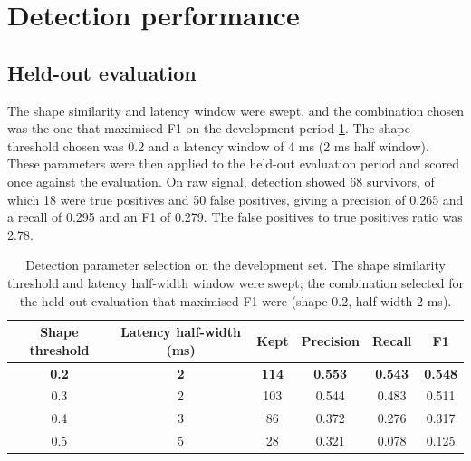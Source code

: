 \documentclass[ %
                    author={Daniel Page},
                supervisor={Dr. Andrew Calway},
                    degree={MSc},
                     title={Some Structural Guidelines for Data Science MSc Theses, Including Those With Long Titles that Run Across Multiple Lines on the Front Page},
                  subtitle={And those including an optional subtitle too, for good measure},
                      type={},
                      year={2021}]{dissertation}
\begin{document}
\section{Detection performance}
\subsection{Held-out evaluation}
The shape similarity and latency window were swept, and the combination chosen was the one that maximised F1 on the development period \ref{tab:dev-sweep}. The shape threshold chosen was 0.2 and a latency window of 4 ms (2 ms half window). 
These parameters were then applied to the held-out evaluation period and scored once against the evaluation. On raw signal, detection showed 68 survivors, of which 18 were true positives and 50 false positives, giving a precision of 0.265 and a recall of 0.295 and an F1 of 0.279. The false positives to true positives ratio was 2.78. 
\begin{table}[htbp]
    \centering
    \begin{tabular}{cccccc}
    \toprule
    Shape threshold & Latency half-width (ms) & Kept & Precision & Recall & F1 \\
    \midrule
    \textbf{0.2} & \textbf{2} & \textbf{114} & \textbf{0.553} & \textbf{0.543} & \textbf{0.548} \\
    0.3 & 2 & 103 & 0.544 & 0.483 & 0.511 \\
    0.4 & 3 & 86 & 0.372 & 0.276 & 0.317 \\
    0.5 & 5 & 28 & 0.321 & 0.078 & 0.125 \\
    \bottomrule
    \end{tabular}
    \caption{Detection parameter selection on the development set. The shape similarity threshold and latency half-width window were swept; the combination selected for the held-out evaluation that maximised F1 were (shape 0.2, half-width 2 ms).}
    \label{tab:dev-sweep}
\end{table}
\end{document}
